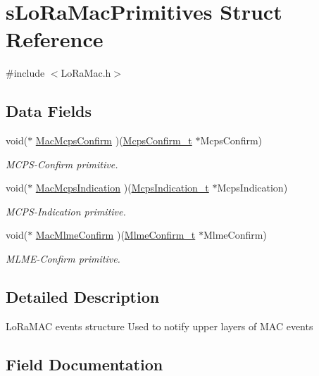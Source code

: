 \hypertarget{structsLoRaMacPrimitives}{}\section{s\+Lo\+Ra\+Mac\+Primitives Struct Reference}
\label{structsLoRaMacPrimitives}


{\ttfamily \#include $<$Lo\+Ra\+Mac.\+h$>$}

\subsection*{Data Fields}
\begin{DoxyCompactItemize}
\item 
void($\ast$ \hyperlink{structsLoRaMacPrimitives_acf5c5408390c791958dc72f1496b3878}{Mac\+Mcps\+Confirm} )(\hyperlink{group__LORAMAC_ga925536babf8abe83918a19f5ae88bd44}{Mcps\+Confirm\+\_\+t} $\ast$Mcps\+Confirm)
\begin{DoxyCompactList}\small\item\em M\+C\+P\+S-\/\+Confirm primitive. \end{DoxyCompactList}\item 
void($\ast$ \hyperlink{structsLoRaMacPrimitives_aa7eb02232243c705b7ac43a89fa3aed0}{Mac\+Mcps\+Indication} )(\hyperlink{group__LORAMAC_ga202591b6553d63fae89bd42787496616}{Mcps\+Indication\+\_\+t} $\ast$Mcps\+Indication)
\begin{DoxyCompactList}\small\item\em M\+C\+P\+S-\/\+Indication primitive. \end{DoxyCompactList}\item 
void($\ast$ \hyperlink{structsLoRaMacPrimitives_af92fa5e7a0dcb1139adc5f60ef1538c1}{Mac\+Mlme\+Confirm} )(\hyperlink{group__LORAMAC_ga73d9d9e11e282a6c258c4d22865fe824}{Mlme\+Confirm\+\_\+t} $\ast$Mlme\+Confirm)
\begin{DoxyCompactList}\small\item\em M\+L\+M\+E-\/\+Confirm primitive. \end{DoxyCompactList}\end{DoxyCompactItemize}


\subsection{Detailed Description}
Lo\+Ra\+M\+AC events structure Used to notify upper layers of M\+AC events 

\subsection{Field Documentation}
\mbox{\label{structsLoRaMacPrimitives_acf5c5408390c791958dc72f1496b3878}} 
